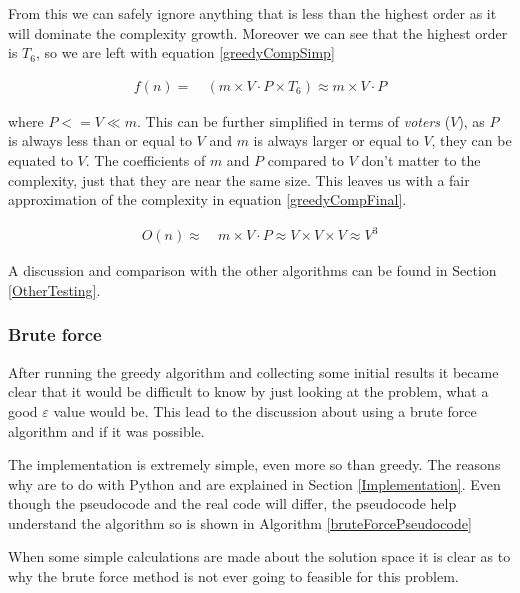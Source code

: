 \documentclass[12pt]{report}
\begin{document}
From this we can safely ignore anything that is less than the highest order as it will dominate the complexity growth. Moreover we can see that the highest order is $T_6$, so we are left with equation \ref{greedyCompSimp}

\begin{equation}\label{greedyCompSimp}
\begin{aligned}
	f(n) ={} & \ (m \times V \cdot P \times T_6) \approx m \times V \cdot P
\end{aligned}
\end{equation}

where $P <= V \ll m$. This can be further simplified in terms of \textit{voters} ($V$), as $P$ is always less than or equal to $V$ and $m$ is always larger or equal to $V$, they can be equated to $V$. The coefficients of $m$ and $P$ compared to $V$ don't matter to the complexity, just that they are near the same size. This leaves us with a fair approximation of the complexity in equation \ref{greedyCompFinal}.

\begin{equation}\label{greedyCompFinal}
\begin{aligned}
	O(n) \approx{} & \ m \times V \cdot P \approx V \times V \times V \approx V^3
\end{aligned}
\end{equation}

A discussion and comparison with the other algorithms can be found in Section \ref{OtherTesting}.

\subsubsection{Brute force}
After running the greedy algorithm and collecting some initial results it became clear that it would be difficult to know by just looking at the problem, what a good $\varepsilon$ value would be. This lead to the discussion about using a brute force algorithm and if it was possible. 

The implementation is extremely simple, even more so than greedy. The reasons why are to do with Python and are explained in Section \ref{Implementation}. Even though the pseudocode and the real code will differ, the pseudocode help understand the algorithm so is shown in Algorithm \ref{bruteForcePseudocode}

When some simple calculations are made about the solution space it is clear as to why the brute force method is not ever going to feasible for this problem. 
\end{document}
